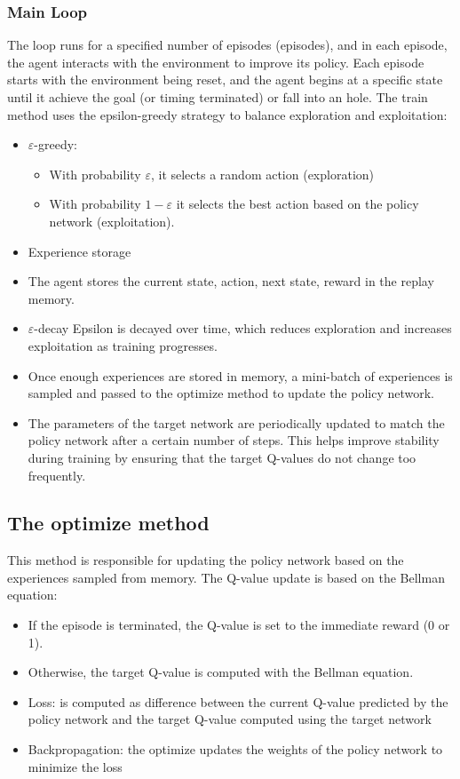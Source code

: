     \subsubsection{Main Loop}
    The loop runs for a specified number of episodes (episodes), and in each episode, the agent interacts with the environment to improve its policy.
    Each episode starts with the environment being reset, and the agent begins at a specific state until it achieve the goal (or timing terminated) or fall into an hole.
    The train method uses the epsilon-greedy strategy to balance exploration and exploitation:
    \begin{itemize}
        \item $\varepsilon$-greedy:
        \begin{itemize}
            \item With probability $\varepsilon$, it selects a random action (exploration)
            \item With probability $1-\varepsilon$ it selects the best action based on the policy network (exploitation).
        \end{itemize}
        \item Experience storage
        \item The agent stores the current state, action, next state, reward in the replay memory.
        \item $\varepsilon$-decay Epsilon is decayed over time, which reduces exploration and increases exploitation as training progresses.
        \item Once enough experiences are stored in memory, a mini-batch of experiences is sampled and passed to the optimize method to update the policy network.
        \item The parameters of the target network are periodically updated to match the policy network after a certain number of steps.
         This helps improve stability during training by ensuring that the target Q-values do not change too frequently.
    \end{itemize}
    \subsection{The optimize method}
    This method is responsible for updating the policy network based on the experiences sampled from memory.
    The Q-value update is based on the Bellman equation:
    \begin{itemize}
        \item If the episode is terminated, the Q-value is set to the immediate reward (0 or 1).
        \item Otherwise, the target Q-value is computed with the Bellman equation.
        \item Loss: is computed as difference between the current Q-value predicted by the policy network and 
        the target Q-value computed using the target network
        \item Backpropagation: the optimize updates the weights of the policy network to minimize the loss
    \end{itemize}
